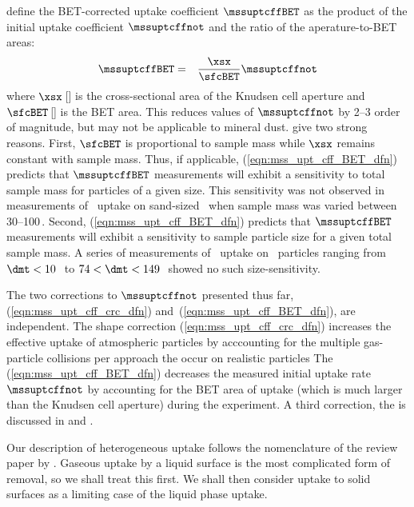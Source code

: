 \documentclass[12pt,twoside]{book}
\begin{document}
\cite{HaC01a} define the BET-corrected uptake coefficient
$\mssuptcffBET$ as the product of the initial uptake coefficient
$\mssuptcffnot$ and the ratio of the aperature-to-BET areas:
\begin{eqnarray}
\mssuptcffBET & = & \frac{\xsx}{\sfcBET} \mssuptcffnot
\label{eqn:mss_upt_cff_BET_dfn}
\end{eqnarray}
where $\xsx$\,[\mS] is the cross-sectional area of the Knudsen cell
aperture and $\sfcBET$\,[\mS] is the BET area.
This  reduces values of $\mssuptcffnot$ by
2--3 order of magnitude, but may not be applicable to mineral dust.
\cite{HaC01a} give two strong reasons.
First, $\sfcBET$ is proportional to sample mass while $\xsx$ remains
constant with sample mass.
Thus, if applicable, (\ref{eqn:mss_upt_cff_BET_dfn}) predicts that
$\mssuptcffBET$ measurements will exhibit a sensitivity to total
sample mass for particles of a given size. 
This sensitivity was not observed in measurements of \HNOt\ uptake on 
sand-sized \AldOt\ when sample mass was varied between 30--100\,\mg.
Second, (\ref{eqn:mss_upt_cff_BET_dfn}) predicts that $\mssuptcffBET$
measurements will exhibit a sensitivity to sample particle size for a
given total sample mass.
A series of measurements of \HNOt\ uptake on \AldOt\ particles ranging
from $\dmt < 10$\,\um\ to $74 < \dmt < 149$\,\um\ showed no such
size-sensitivity.

The two corrections to $\mssuptcffnot$ presented thus far,
(\ref{eqn:mss_upt_cff_crc_dfn}) and~(\ref{eqn:mss_upt_cff_BET_dfn}),
are independent.
The shape correction (\ref{eqn:mss_upt_cff_crc_dfn}) increases the
effective uptake of atmospheric particles by acccounting for the
multiple gas-particle collisions per approach the occur on realistic
particles 
The  (\ref{eqn:mss_upt_cff_BET_dfn}) decreases
the measured initial uptake rate $\mssuptcffnot$ by accounting for the  
BET area of uptake (which is much larger than the Knudsen cell
aperture) during the experiment.
A third correction, the  is
discussed in \cite{USP01} and \cite{HaC01a}.

Our description of heterogeneous uptake follows the nomenclature of
the review paper by \cite{KWZ95}.
Gaseous uptake by a liquid surface is the most complicated form of 
removal, so we shall treat this first.
We shall then consider uptake to solid surfaces as a limiting case of
the liquid phase uptake.
\end{document}
